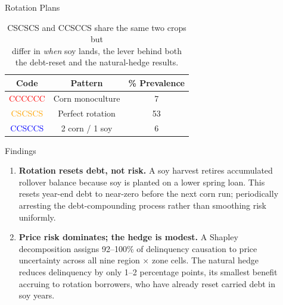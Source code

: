 \documentclass[final]{beamer}
\newlength{\sepwid}
\newlength{\onecolwid}
\newlength{\twocolwid}
\begin{document}
\begin{frame}[t]
\begin{columns}[t]
\begin{column}{\twocolwid}
\begin{columns}[t,totalwidth=\twocolwid]
\begin{column}{\onecolwid}
\end{column}

\end{columns}

\end{column}

\begin{column}{\sepwid}\end{column}

\begin{column}{\onecolwid}

\begin{block}{Rotation Plans}
\begin{table}
\centering
\begin{tabular}{ccc}
\toprule
Code & Pattern & \% Prevalence\\
\midrule
\textcolor{red}{CCCCCC}   & Corn monoculture  & 7  \\
\textcolor{orange}{CSCSCS} & Perfect rotation  & 53 \\
\textcolor{blue}{CCSCCS}  & 2 corn / 1 soy    & 6  \\
\bottomrule
\end{tabular}
\caption{CSCSCS and CCSCCS share the same two crops but\\
 differ in \emph{when} soy lands, the lever behind both\\
 the debt-reset and the natural-hedge results.}
\label{tab:rot_perc}
\end{table}
\vspace{1.2cm}
\end{block}

\begin{block}{Findings}
\begin{enumerate}

  \item \textbf{Rotation resets debt, not risk.} A soy harvest retires accumulated
  rollover balance because soy is planted on a lower spring loan. This resets
  year-end debt to near-zero before the next corn run; periodically arresting
  the debt-compounding process rather than smoothing risk uniformly.

  \item \textbf{Price risk dominates; the hedge is modest.} A Shapley decomposition
  assigns 92--100\% of delinquency causation to price uncertainty across all nine
  region $\times$ zone cells. The natural hedge reduces delinquency by only 1--2
  percentage points, its smallest benefit accruing to rotation borrowers, who
  have already reset carried debt in soy years.


\end{enumerate}
\end{block}
\end{column}
\end{columns}
\end{frame}
\end{document}
